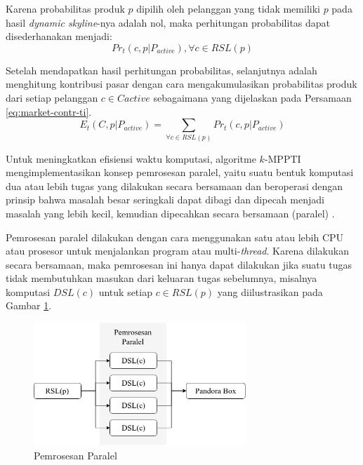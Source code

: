 Karena probabilitas produk $p$ dipilih oleh pelanggan yang tidak memiliki $p$ pada hasil \textit{dynamic skyline}-nya adalah nol, maka perhitungan probabilitas dapat disederhanakan menjadi:
\begin{equation}\label{eq:prob-ti-rsl}
Pr_t(c, p|P_{active}), \forall c \in RSL(p)
\end{equation}


Setelah mendapatkan hasil perhitungan probabilitas, selanjutnya adalah menghitung kontribusi pasar dengan cara mengakumulasikan probabilitas produk dari setiap pelanggan $c \in Cactive$ sebagaimana yang dijelaskan pada Persamaan \ref{eq:market-contr-ti}. 
\begin{equation}\label{eq:market-contr-ti}
E_t(C, p|P_{active}) = \sum_{\forall c \in RSL(p)} Pr_t(c, p|P_{active})
\end{equation} 


Untuk meningkatkan efisiensi waktu komputasi, algoritme $k$-MPPTI mengimplementasikan konsep pemrosesan paralel, yaitu suatu bentuk komputasi dua atau lebih tugas yang dilakukan secara bersamaan dan beroperasi dengan prinsip bahwa masalah besar seringkali dapat dibagi dan dipecah menjadi masalah yang lebih kecil, kemudian dipecahkan secara bersamaan (paralel) \cite{paralel}. 

Pemrosesan paralel dilakukan dengan cara menggunakan satu atau lebih CPU atau prosesor untuk menjalankan program atau multi-\textit{thread}. Karena dilakukan secara bersamaan, maka pemrosesan ini hanya dapat dilakukan jika suatu tugas tidak membutuhkan masukan dari keluaran tugas sebelumnya, misalnya komputasi $DSL(c)$ untuk setiap $c \in RSL(p)$ yang diilustrasikan pada Gambar \ref{fig:paralel}.

\begin{figure}[h]
	\centering
	\includegraphics[width=8cm]{assets/img/bab3/paralel.png}
	\caption{Pemrosesan Paralel}
	\label{fig:paralel}
\end{figure}

